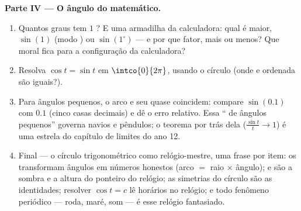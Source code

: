 \begin{problem}
\medskip
\noindent\textbf{Parte IV --- O ângulo do matemático.}
\begin{enumerate}[resume]
  \item Quantos graus tem $1$ ? E uma armadilha da
        calculadora: qual é maior, $\sin(1)$ (modo ) ou
        $\sin(1^\circ)$ --- e por que fator, mais ou menos? Que
        moral fica para a configuração da calculadora?
  \item Resolva $\cos t = \sin t$ em $\intco{0}{2\pi}$, usando o
        círculo (onde  e ordenada são iguais?).
  \item Para ângulos pequenos, o arco e seu  quase
        coincidem: compare $\sin(0.1)$ com $0.1$ (cinco casas
        decimais) e dê o erro relativo. Essa `` de
        ângulos pequenos'' governa navios e pêndulos; o teorema
        por trás dela ($\frac{\sin t}{t} \to 1$) é uma estrela do
        capítulo de limites do ano 12.
  \item Final --- o círculo trigonométrico como relógio-mestre,
        uma frase por item: os  transformam ângulos em
        números honestos (arco $=$ raio $\times$ ângulo); 
        e  são a sombra e a altura do ponteiro do relógio; as
        simetrias do círculo são as identidades; resolver
        $\cos t = c$ lê horários no relógio; e todo fenômeno
        periódico --- roda, maré, som --- é esse relógio
        fantasiado.
\end{enumerate}
\end{problem}
